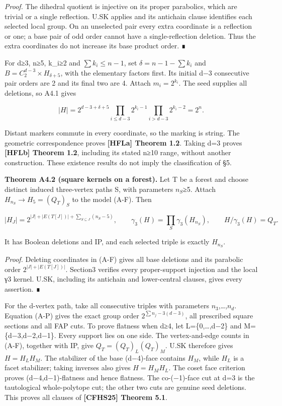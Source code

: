 \documentclass[
  11pt,
  a4paper,
]{article}
\begin{document}
\emph{Proof.} The dihedral quotient is injective on its proper
parabolics, which are trivial or a single reflection. U.SK applies and
its antichain clause identifies each selected local group. On an
unselected pair every extra coordinate is a reflection or one; a base
pair of odd order cannot have a single-reflection deletion. Thus the
extra coordinates do not increase its base product order. ∎

For d≥3, n≥5, k\_i≥2 and \(\sum k_i\le n-1\), set
\(\delta=n-1-\sum k_i\) and \(B=C_2^{d-3}\times H_{\delta+5}\), with the
elementary factors first. Its initial d−3 consecutive pair orders are 2
and its final two are 4. Attach \(m_i=2^{k_i}\). The seed supplies all
deletions, so A4.1 gives

\[
 |H|=2^{d-3+\delta+5}
       \prod_{i\le d-3}2^{k_i-1}
       \prod_{i>d-3}2^{k_i-2}=2^n.
\]

Distant markers commute in every coordinate, so the marking is string.
The geometric correspondence proves \textbf{{[}HFLa{]} Theorem 1.2}.
Taking d=3 proves \textbf{{[}HFLb{]} Theorem 1.2}, including its stated
n≥10 range, without another construction. These existence results do not
imply the classification of §5.

\textbf{Theorem A4.2 (square kernels on a forest).} Let T be a forest
and choose distinct induced three-vertex paths S, with parameters
\(n_S\)≥5. Attach \(H_{n_S}\to H_5=(Q_T)_S\) to the model (A-F). Then

\[
 |H_J|=2^{|J|+|E(T[J])|+\sum_{S\subseteq J}(n_S-5)},\qquad
 \gamma_3(H)=\prod_S\gamma_3(H_{n_S}),\qquad H/\gamma_3(H)=Q_T.
 \tag{A-P}
\]

It has Boolean deletions and IP, and each selected triple is exactly
\(H_{n_S}\).

\emph{Proof.} Deleting coordinates in (A-F) gives all base deletions and
its parabolic order \(2^{|J|+|E(T[J])|}\). Section3 verifies every
proper-support injection and the local γ3 kernel. U.SK, including its
antichain and lower-central clauses, gives every assertion. ∎

For the d-vertex path, take all consecutive triples with parameters
\(n_3\),\ldots,\(n_d\). Equation (A-P) gives the exact group order
\(2^{\sum n_j-3(d-3)}\), all prescribed square sections and all FAP
cuts. To prove flatness when d≥4, let L=\{0,\ldots,d−2\} and
M=\{d−3,d−2,d−1\}. Every support lies on one side. The vertex-and-edge
counts in (A-F), together with IP, give \(Q_T=(Q_T)_L(Q_T)_M\). U.SK
therefore gives \(H=H_LH_M\). The stabilizer of the base (d−4)-face
contains \(H_M\), while \(H_L\) is a facet stabilizer; taking inverses
also gives \(H=H_MH_L\). The coset face criterion proves
(d−4,d−1)-flatness and hence flatness. The co-(−1)-face cut at d=3 is
the tautological whole-polytope cut; the other two cuts are genuine seed
deletions. This proves all clauses of \textbf{{[}CFHS25{]} Theorem 5.1}.
\end{document}
